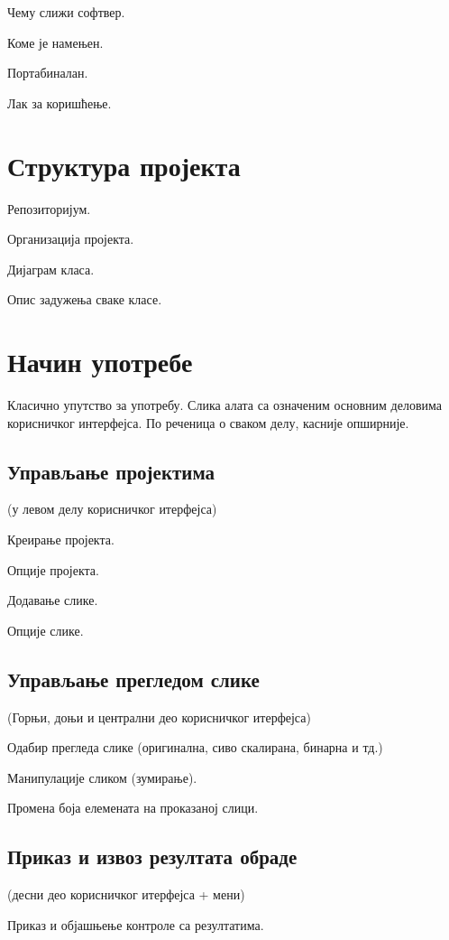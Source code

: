 \documentclass[12pt,a4paper,serbian,oneside]{book}
\begin{document}
Чему слижи софтвер.

Коме је намењен.

Портабиналан.

Лак за коришћење.

\section{Структура пројекта}

Репозиторијум.

Организација пројекта.

Дијаграм класа.

Опис задужења сваке класе.

\section{Начин употребе}

Класично упутство за употребу.
Слика алата са означеним основним деловима корисничког интерфејса.
По реченица о сваком делу, касније опширније.

\subsection{Управљање пројектима}

(у левом делу корисничког итерфејса)

Креирање пројекта.

Опције пројекта.

Додавање слике.

Опције слике.

\subsection{Управљање прегледом слике}

(Горњи, доњи и централни део корисничког итерфејса)

Одабир прегледа слике (оригинална, сиво скалирана, бинарна и  тд.) 

Манипулације сликом (зумирање).

Промена боја елемената на проказаној слици.

\subsection{Приказ и извоз резултата обраде}

(десни део корисничког итерфејса + мени)

Приказ и објашњење контроле са резултатима.
\end{document}
